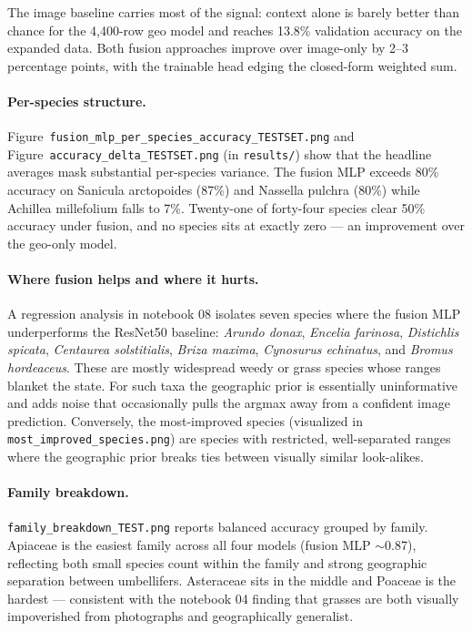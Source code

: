 \documentclass[11pt]{article}
\begin{document}
The image baseline carries most of the signal: context alone is barely better than chance for the 4{,}400-row geo model and reaches 13.8\% validation accuracy on the expanded data. Both fusion approaches improve over image-only by 2--3 percentage points, with the trainable head edging the closed-form weighted sum.

\paragraph{Per-species structure.} Figure~\texttt{fusion\_mlp\_per\_species\_accuracy\_TESTSET.png} and Figure~\texttt{accuracy\_delta\_TESTSET.png} (in \texttt{results/}) show that the headline averages mask substantial per-species variance. The fusion MLP exceeds 80\% accuracy on Sanicula arctopoides (87\%) and Nassella pulchra (80\%) while Achillea millefolium falls to 7\%. Twenty-one of forty-four species clear 50\% accuracy under fusion, and no species sits at exactly zero --- an improvement over the geo-only model.

\paragraph{Where fusion helps and where it hurts.} A regression analysis in notebook 08 isolates seven species where the fusion MLP underperforms the ResNet50 baseline: \textit{Arundo donax}, \textit{Encelia farinosa}, \textit{Distichlis spicata}, \textit{Centaurea solstitialis}, \textit{Briza maxima}, \textit{Cynosurus echinatus}, and \textit{Bromus hordeaceus}. These are mostly widespread weedy or grass species whose ranges blanket the state. For such taxa the geographic prior is essentially uninformative and adds noise that occasionally pulls the argmax away from a confident image prediction. Conversely, the most-improved species (visualized in \texttt{most\_improved\_species.png}) are species with restricted, well-separated ranges where the geographic prior breaks ties between visually similar look-alikes.

\paragraph{Family breakdown.} \texttt{family\_breakdown\_TEST.png} reports balanced accuracy grouped by family. Apiaceae is the easiest family across all four models (fusion MLP $\sim$0.87), reflecting both small species count within the family and strong geographic separation between umbellifers. Asteraceae sits in the middle and Poaceae is the hardest --- consistent with the notebook 04 finding that grasses are both visually impoverished from photographs and geographically generalist.
\end{document}
